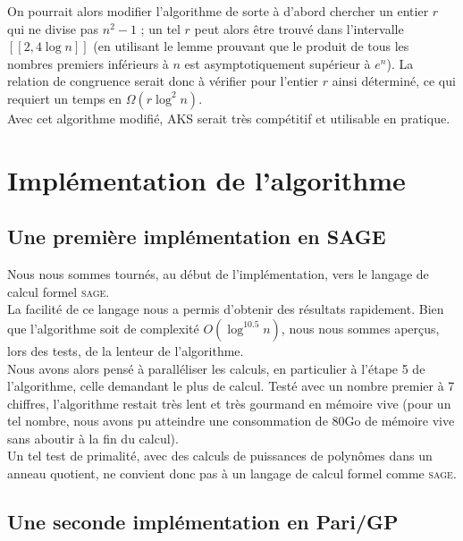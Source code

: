 \documentclass[11pt]{article}
\begin{document}
On pourrait alors modifier l'algorithme de sorte à d'abord chercher un entier $r$ qui ne divise pas $n^2-1$ ; un tel $r$ peut alors être trouvé dans l'intervalle $[\![2,4\log n]\!]$ (en utilisant le lemme prouvant que le produit de tous les nombres premiers inférieurs à $n$ est asymptotiquement supérieur à $e^n$). La relation de congruence serait donc à vérifier pour l'entier $r$ ainsi déterminé, ce qui requiert un temps en $\Omega(r\log^2 n)$.\\

Avec cet algorithme modifié, AKS serait très compétitif et utilisable en pratique.

\newpage


\section{Implémentation de l'algorithme}

\subsection{Une première implémentation en SAGE}

Nous nous sommes tournés, au début de l'implémentation, vers le langage de calcul formel \textsc{sage}.\\

La facilité de ce langage nous a permis d'obtenir des résultats rapidement. Bien que l'algorithme soit de complexité $O(\log^{10.5} n)$, nous nous sommes aperçus, lors des tests, de la lenteur de l'algorithme.\\

Nous avons alors pensé à paralléliser les calculs, en particulier à l'étape 5 de l'algorithme, celle demandant le plus de calcul. Testé avec un nombre premier à 7 chiffres, l'algorithme restait très lent et très gourmand en mémoire vive (pour un tel nombre, nous avons pu atteindre une consommation de 80Go de mémoire vive sans aboutir à la fin du calcul).\\

Un tel test de primalité, avec des calculs de puissances de polynômes dans un anneau quotient, ne convient donc pas à un langage de calcul formel comme \textsc{sage}.

\subsection{Une seconde implémentation en Pari/GP}
\end{document}
